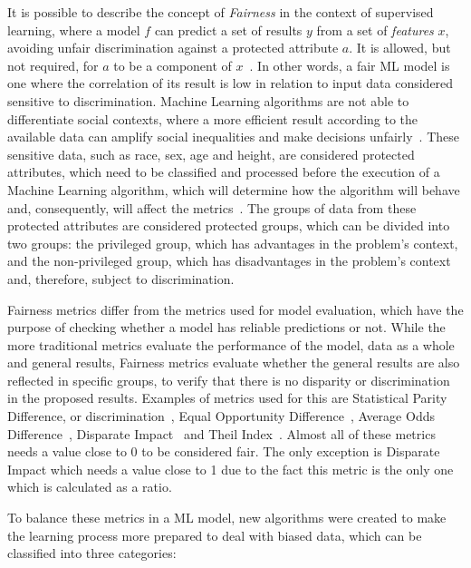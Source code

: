 \documentclass[10pt,conference]{IEEEtran}
\begin{document}
It is possible to describe the concept of \textit{Fairness} in the context of supervised learning, where a model $f$ can predict a set of results $y$ from a set of \textit{features} $x$, avoiding unfair discrimination against a protected attribute $a$. It is allowed, but not required, for $a$ to be a component of $x$~\citep{Begley_2021}. In other words, a fair ML model is one where the correlation of its result is low in relation to input data considered sensitive to discrimination. Machine Learning algorithms are not able to differentiate social contexts, where a more efficient result according to the available data can amplify social inequalities and make decisions unfairly~\citep{Mehrabi_2021}. These sensitive data, such as race, sex, age and height, are considered protected attributes, which need to be classified and processed before the execution of a Machine Learning algorithm, which will determine how the algorithm will behave and, consequently, will affect the metrics~\citep{Mougan_2022}. The groups of data from these protected attributes are considered protected groups, which can be divided into two groups: the privileged group, which has advantages in the problem's context, and the non-privileged group, which has disadvantages in the problem's context and, therefore, subject to discrimination.

Fairness metrics differ from the metrics used for model evaluation, which have the purpose of checking whether a model has reliable predictions or not. While the more traditional metrics evaluate the performance of the model, data as a whole and general results, Fairness metrics evaluate whether the general results are also reflected in specific groups, to verify that there is no disparity or discrimination in the proposed results. Examples of metrics used for this are Statistical Parity Difference, or discrimination~\citep{Zemel_2013}, Equal Opportunity Difference~\citep{Biswas_2020}, Average Odds Difference~\citep{Biswas_2020}, Disparate Impact~\citep{Biswas_2020} and Theil Index~\citep{Speicher_2018}. Almost all of these metrics needs a value close to 0 to be considered fair. The only exception is Disparate Impact which needs a value close to 1 due to the fact this metric is the only one which is calculated as a ratio.

To balance these metrics in a ML model, new algorithms were created to make the learning process more prepared to deal with biased data, which can be classified into three categories: 
\end{document}
